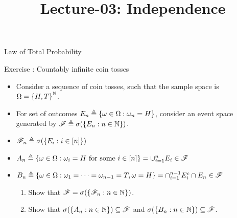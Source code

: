 \documentclass[12pt,aspectratio=169]{beamer}
\title{Lecture-03: Independence}
\date{}
\begin{document}
\pagestyle{empty}
\maketitle

\begin{frame}{Law of Total Probability}
\begin{block}{Exercise : Countably infinite coin tosses} 
\begin{itemize}
    \item <1-> Consider a sequence of coin tosses, such that the sample space is $\Omega = \left\{H,T\right\}^{\mathbb{N}}$. 
    \item <2-> For set of outcomes $E_n \triangleq \left\{\omega \in \Omega: \omega_n = H\right\}$, consider an event space generated by $\mathscr{F} \triangleq \sigma(\left\{E_n: n\in \mathbb{N}\right\})$. 
    \item <3-> $\mathscr{F}_n \triangleq \sigma(\left\{E_i: i \in [n]\right\})$
    \item <4-> $A_n \triangleq \left\{\omega \in \Omega: \omega_i = H \text{ for some } i \in [n]\right\} = \cup_{i=1}^nE_i \in \mathscr{F}$ 
    \item <5-> $B_n \triangleq \left\{\omega \in \Omega: \omega_1 = \dots = \omega_{n-1}= T, \omega = H\right\} = \cap_{i=1}^{n-1}E_i^c\cap E_n \in \mathscr{F}$
    \begin{enumerate}
        \item <6-> Show that $\mathscr{F} = \sigma(\left\{\mathscr{F}_n: n \in \mathbb{N}\right\})$. 
        \item <7-> Show that $\sigma(\left\{A_n: n \in \mathbb{N}\right\}) \subseteq \mathscr{F}$ and $\sigma(\left\{B_n: n\in \mathbb{N}\right\}) \subseteq \mathscr{F}$. 
    \end{enumerate}
\end{itemize}
\end{block}
\end{frame}
\end{document}

